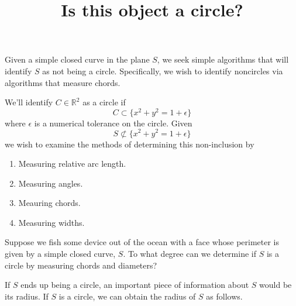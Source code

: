 \documentclass[11pt]{amsart}
\title{Is this object a circle?}
\author{}
\date{}
\newcommand{\R}{\mathbb{R}}
\theoremstyle{plain}
\theoremstyle{definition}
\theoremstyle{remark}
\begin{document}
\maketitle



Given a simple closed curve in the plane $S$, we seek simple
algorithms that will identify $S$ as not being a circle. Specifically,
we wish to identify noncircles via algorithms that measure chords.

We'll identify $C\in\R^2$ as a circle if
\[
C\subset \{x^2+y^2 = 1 + \epsilon \}
\]
where $\epsilon$ is a numerical tolerance on the circle. Given
\[
S\not\subset \{x^2+y^2 = 1 + \epsilon \}
\]
we wish to examine the methods of determining this non-inclusion by
\begin{enumerate}
\item Measuring relative arc length.
\item Measuring angles.
\item Meauring chords.
\item Measuring widths.
\end{enumerate}

Suppose we fish some device out of the ocean with a face whose
perimeter is given by a simple closed curve, \(S\).  To what degree
can we determine if \(S\) is a circle by measuring chords and
diameters?


If \(S\) ends up being a circle, an important piece of information
about \(S\) would be its radius.  If \(S\) is a circle, we can obtain
the radius of \(S\) as follows.
\end{document}
